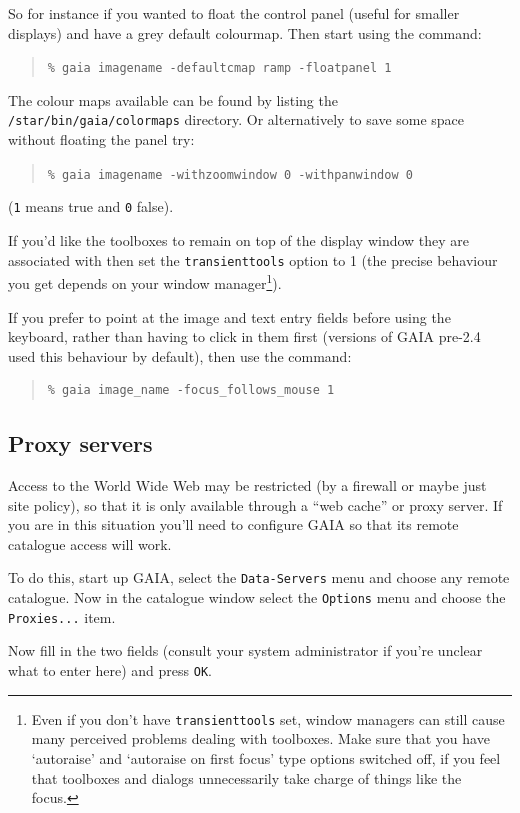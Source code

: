 \documentclass[twoside,11pt]{article}
\newcommand{\xlabel}[1]{}
\renewcommand{\_}{\texttt{\symbol{95}}}
\newcommand{\mytt}[1]{{\texttt{#1}}}
\begin{document}
So for instance if you wanted to float the control panel (useful for
smaller displays) and have a grey default colourmap. Then start
using the command:
\begin{quote}
\mytt{\% gaia image\_name -default\_cmap ramp -float\_panel 1}
\end{quote}
The colour maps available can be found by listing the
\mytt{/star/bin/gaia/colormaps} directory. Or alternatively to save
some space without floating the panel try:
\begin{quote}
\mytt{\% gaia image\_name -with\_zoom\_window 0 -with\_pan\_window 0}
\end{quote}
(\mytt{1} means true and \mytt{0} false).

If you'd like the toolboxes to remain on top of the display window
they are associated with then set the \mytt{transient\_tools} option
to 1 (the precise behaviour you get depends on your window
manager\footnote{Even if you don't have \mytt{transient\_tools} set,
window managers can still cause many perceived problems dealing with
toolboxes. Make sure that you have `autoraise' and `autoraise on first
focus' type options switched off, if you feel that toolboxes and
dialogs unnecessarily take charge of things like the focus.}).

If you prefer to point at the image and text entry fields before using
the keyboard, rather than having to click in them first (versions of
GAIA pre-2.4 used this behaviour by default), then use the command:
\begin{quote}
\begin{verbatim}
% gaia image_name -focus_follows_mouse 1
\end{verbatim}
\end{quote}

\subsection{\xlabel{proxy_servers}Proxy servers}
Access to the World Wide Web may be restricted (by a firewall or maybe
just site policy), so that it is only available through a ``web
cache'' or proxy server. If you are in this situation you'll need to
configure GAIA so that its remote catalogue access will work.

To do this, start up GAIA, select the \mytt{Data-Servers} menu and
choose any remote catalogue. Now in the catalogue window select the
\mytt{Options} menu and choose the \mytt{Proxies...} item.

Now fill in the two fields (consult your system administrator if you're
unclear what to enter here) and press \mytt{OK}.
\end{document}
